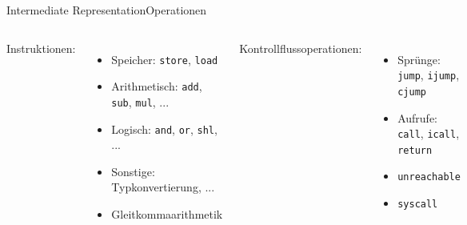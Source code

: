 \begin{frame}{Intermediate Representation}{Operationen}


    \vspace{1cm}

    \begin{columns}[t]
        Instruktionen:
        \begin{itemize}
            \setlength\itemsep{0.3em}
            \item Speicher: \texttt{store}, \texttt{load}
            \item Arithmetisch: \texttt{add}, \texttt{sub}, \texttt{mul}, ...
            \item Logisch: \texttt{and}, \texttt{or}, \texttt{shl}, ...
            \item Sonstige: Typkonvertierung, ...
            \item Gleitkommaarithmetik
        \end{itemize}

        Kontrollflussoperationen:
        \begin{itemize}
            \setlength\itemsep{0.3em}
            \item Sprünge: \texttt{jump}, \texttt{ijump}, \texttt{cjump}
            \item Aufrufe: \texttt{call}, \texttt{icall}, \texttt{return}
            \item \texttt{unreachable}
            \item \texttt{syscall}
        \end{itemize}
    \end{columns}
\end{frame}


